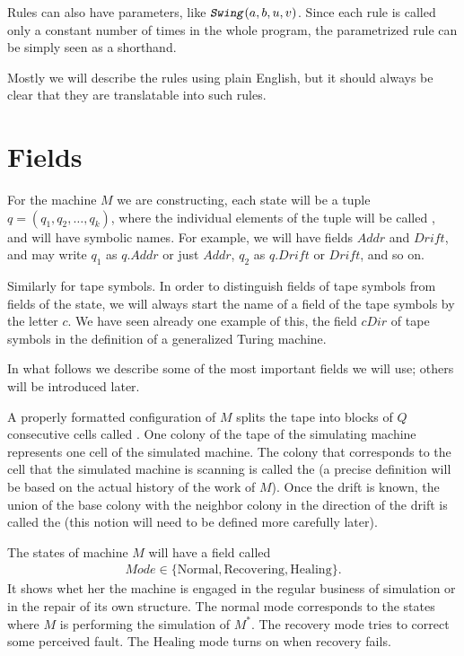\documentclass[12pt]{memoir}
\newcommand{\fld}[1]{\ensuremath{\textit{#1}}}
\newcommand{\rul}[1]{\ensuremath{\texttt{\slshape #1\/}}}
\newcommand{\Addr}{\fld{Addr}}
\newcommand{\cDir}{\fld{cDir}}
\newcommand{\Drift}{\fld{Drift}}
\newcommand{\Mode}{\fld{Mode}}
\newcommand{\Healing}{\mathrm{Healing}}
\newcommand{\Normal}{\mathrm{Normal}}
\newcommand{\Recovering}{\mathrm{Recovering}}
\newcommand{\ruSwing}{\rul{Swing}}
\begin{document}
Rules can also have parameters, like \( \ruSwing(a,b,u,v) \).
Since each rule is called only a constant number of times in the whole program,
the parametrized rule can be simply seen as a shorthand.

Mostly we will describe
the rules using plain English, but it should always be clear that they
are translatable into such rules.


\section{Fields}\label{sec:fields}

\begin{sloppypar}
For the machine \( M \) we are constructing, each state will 
be a tuple \( q=(q_{1},q_{2},\dots,q_{k}) \),
where the individual elements of the tuple will be called , and will
have symbolic names.
For example, we will have fields \( \Addr \) and \( \Drift \),
and may write \( q_{1} \) as \( q.\Addr \) or just \( \Addr \), 
\( q_{2} \) as \( q.\Drift \) or \( \Drift \), and so on.
\end{sloppypar}

Similarly for tape symbols.
In order to distinguish fields of tape symbols from fields of the state,
we will always start the name of a field of the tape symbols by the letter \( c \).
We have seen already one example of this, the field \( \cDir \) of tape symbols
in the definition of a generalized Turing machine.

In what follows we describe some of the most important fields we will use;
others will be introduced later.

A properly formatted configuration of \( M \) splits the tape into blocks of \( Q \)
consecutive cells called .
One colony of the tape of the simulating
machine represents one cell of the simulated machine.
The colony that corresponds to the cell that the
simulated machine is scanning is called the 
(a precise definition will be based on the actual history of the work of \( M \)).
Once the drift is known, the union of the base colony with the neighbor colony in
the direction of the drift is called the  (this notion will 
need to be defined more carefully later).

The states of machine \( M \) will have a field called 
 \begin{align*}
   \Mode\in\{ \Normal,\Recovering, \Healing \}.
 \end{align*}
It shows whet her the machine is engaged in the regular business of simulation 
or in the repair of its own structure.
The normal mode corresponds to the states
where \( M \) is performing the simulation of \( M^{*} \).
The recovery mode tries to correct some perceived fault.
The \( \Healing \) mode turns on when recovery fails.
\end{document}
